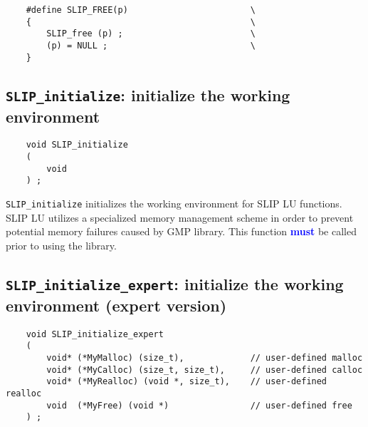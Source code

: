 \documentclass[12pt]{article}
\theoremstyle{definition}
\begin{document}
\begin{mdframed}[userdefinedwidth=6in]
{\footnotesize
\begin{verbatim}
    #define SLIP_FREE(p)                        \
    {                                           \
        SLIP_free (p) ;                         \
        (p) = NULL ;                            \
    }
\end{verbatim}
} \end{mdframed}

\cprotect\subsection{\verb|SLIP_initialize|: initialize the working environment}

\begin{mdframed}[userdefinedwidth=6in]
{\footnotesize
\begin{verbatim}
    void SLIP_initialize
    (
        void
    ) ;
\end{verbatim}
} \end{mdframed}

\verb|SLIP_initialize| initializes the working environment for SLIP LU
functions.
SLIP LU utilizes a specialized memory management scheme in order to
prevent potential memory failures caused by GMP library.
This function \textcolor{blue}{\textbf{must}} be called prior to using the
library.

\cprotect\subsection{\verb|SLIP_initialize_expert|: initialize the working environment (expert version)}\label{ss:SLIP_initialize_expert}

\begin{mdframed}[userdefinedwidth=6in]
{\footnotesize
\begin{verbatim}
    void SLIP_initialize_expert
    (
        void* (*MyMalloc) (size_t),             // user-defined malloc
        void* (*MyCalloc) (size_t, size_t),     // user-defined calloc
        void* (*MyRealloc) (void *, size_t),    // user-defined realloc
        void  (*MyFree) (void *)                // user-defined free
    ) ;
\end{verbatim}
} \end{mdframed}
\end{document}
